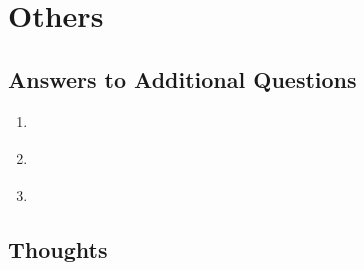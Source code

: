 \documentclass{ExpReport}
\begin{document}

\section{Others}

\subsection{Answers to Additional Questions}

\begin{enumerate}
    \item \textbf{}
    

    \item \textbf{}
    

    \item \textbf{}
    
\end{enumerate}

\subsection{Thoughts}
\end{document}
